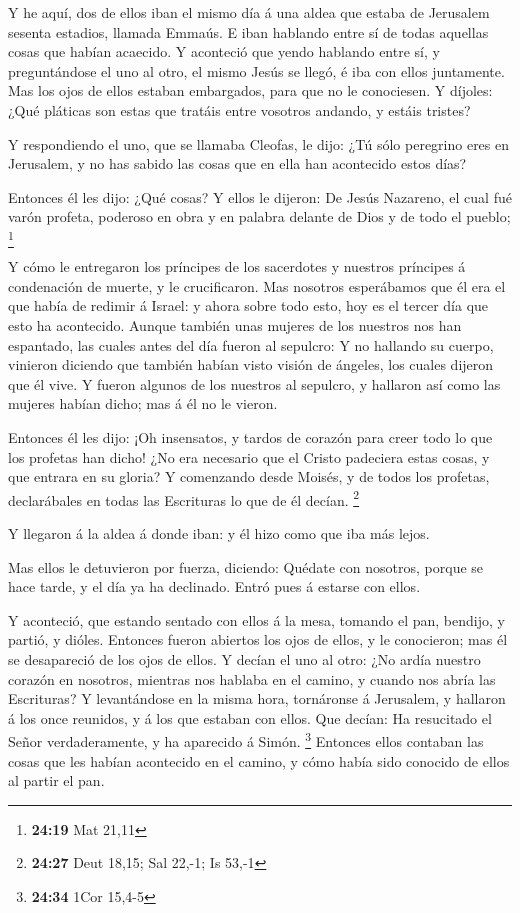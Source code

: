  Y he aquí, dos de ellos iban el mismo día á una aldea
que estaba de Jerusalem sesenta estadios, llamada Emmaús.
 E iban hablando entre sí de todas aquellas cosas que
habían acaecido.  Y aconteció que yendo hablando entre
sí, y preguntándose el uno al otro, el mismo Jesús se llegó, é iba con
ellos juntamente.  Mas los ojos de ellos estaban
embargados, para que no le conociesen.  Y díjoles: ¿Qué
pláticas son estas que tratáis entre vosotros andando, y estáis tristes?

 Y respondiendo el uno, que se llamaba Cleofas, le dijo:
¿Tú sólo peregrino eres en Jerusalem, y no has sabido las cosas que en
ella han acontecido estos días?

 Entonces él les dijo: ¿Qué cosas? Y ellos le dijeron: De
Jesús Nazareno, el cual fué varón profeta, poderoso en obra y en palabra
delante de Dios y de todo el pueblo; \footnote{\textbf{24:19} Mat 21,11}

 Y cómo le entregaron los príncipes de los sacerdotes y
nuestros príncipes á condenación de muerte, y le crucificaron.
 Mas nosotros esperábamos que él era el que había de
redimir á Israel: y ahora sobre todo esto, hoy es el tercer día que esto
ha acontecido.  Aunque también unas mujeres de los
nuestros nos han espantado, las cuales antes del día fueron al sepulcro:
 Y no hallando su cuerpo, vinieron diciendo que también
habían visto visión de ángeles, los cuales dijeron que él vive.
 Y fueron algunos de los nuestros al sepulcro, y hallaron
así como las mujeres habían dicho; mas á él no le vieron.

 Entonces él les dijo: ¡Oh insensatos, y tardos de
corazón para creer todo lo que los profetas han dicho! 
¿No era necesario que el Cristo padeciera estas cosas, y que entrara en
su gloria?  Y comenzando desde Moisés, y de todos los
profetas, declarábales en todas las Escrituras lo que de él decían.
\footnote{\textbf{24:27} Deut 18,15; Sal 22,-1; Is 53,-1}

 Y llegaron á la aldea á donde iban: y él hizo como que
iba más lejos.

 Mas ellos le detuvieron por fuerza, diciendo: Quédate
con nosotros, porque se hace tarde, y el día ya ha declinado. Entró pues
á estarse con ellos.

 Y aconteció, que estando sentado con ellos á la mesa,
tomando el pan, bendijo, y partió, y dióles.  Entonces
fueron abiertos los ojos de ellos, y le conocieron; mas él se
desapareció de los ojos de ellos.  Y decían el uno al
otro: ¿No ardía nuestro corazón en nosotros, mientras nos hablaba en el
camino, y cuando nos abría las Escrituras?  Y
levantándose en la misma hora, tornáronse á Jerusalem, y hallaron á los
once reunidos, y á los que estaban con ellos.  Que
decían: Ha resucitado el Señor verdaderamente, y ha aparecido á Simón.
\footnote{\textbf{24:34} 1Cor 15,4-5}  Entonces ellos
contaban las cosas que les habían acontecido en el camino, y cómo había
sido conocido de ellos al partir el pan.


